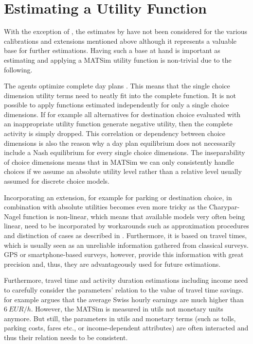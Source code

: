 \section{Estimating a Utility Function}
\label{sec:estimation}
With the exception of \citet[][]{BalmerEtAl_ResRep_datapuls_2010}, the estimates by \citet[][]{Kickhoefer_MastersThesis_2009} have not been considered for the various calibrations and extensions mentioned above although it represents a valuable base for further estimations. Having such a base at hand is important as estimating and applying a MATSim utility function is non-trivial due to the following. 

The agents optimize complete day plans \citep[see also][Section 6.3.1]{MATSim_Userguide_2014}. This means that the single choice dimension utility terms need to neatly fit into the complete function. It is not possible to apply functions estimated independently for only a single choice dimensions. If for example all alternatives for destination choice evaluated with an inappropriate utility function generate negative utility, then the complete activity is simply dropped. This correlation or dependency between choice dimensions is also the reason why a day plan equilibrium does not necessarily include a Nash equilibrium for every single choice dimensions. The inseparability of choice dimensions means that in MATSim we can only consistently handle choices if we assume an absolute utility level rather than a relative level usually assumed for discrete choice models. 

Incorporating an extension, for example for parking or destination choice, in combination with absolute utilities becomes even more tricky as the Charypar-Nagel function is non-linear, which means that available models very often being linear, need to be incorporated by workarounds such as approximation procedures and distinction of cases as described in \citet[][p.75ff]{Horni_PhDThesis_2013}. Furthermore, it is based on travel times, which is usually seen as an unreliable information gathered from classical surveys. GPS or smartphone-based surveys, however, provide this information with great precision and, thus, they are advantageously used for future estimations.

Furthermore, travel time and activity duration estimations including income need to carefully consider the parameters' relation to the value of travel time savings. \citet[][p.276]{MeisterEtAl_SVT_2009} for example argues that the average Swiss hourly earnings are much higher than $6\ EUR/h$. However, the MATSim is measured in utils not monetary units anymore. But still, the parameters in utils and monetary terms (such as tolls, parking costs, fares etc., or income-dependent attributes) are often interacted and thus their relation needs to be consistent.

